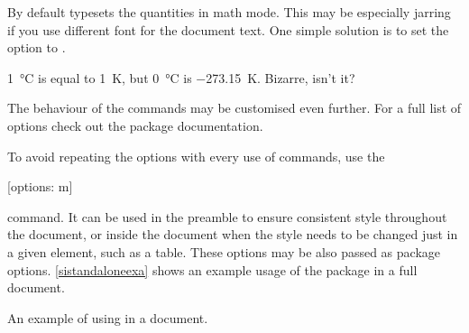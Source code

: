 By default  typesets the quantities in math mode. This may be
especially jarring if you use different font for the document text. One simple
solution is to set the  option to .
\begin{example}
\setmainfont{Source Sans Pro} %
\qty{1}{\degreeCelsius} is
equal to \qty{1}{\kelvin},
but \qty[
  mode = text,
]{0}{\degreeCelsius} is \qty[
  mode = text,
]{-273.15}{\kelvin}.
Bizarre, isn't it?
\end{example}

The behaviour of the commands may be customised even further. For a full list
of options check out the  package documentation.

To avoid repeating the options with every use of commands, use the
\begin{lscommand}
  [options: m]
\end{lscommand}
command. It can be used in the preamble to ensure consistent style throughout
the document, or inside the document when the style needs to be changed just
in a given element, such as a table. These options may be also passed as package
options. \autoref{sistandaloneexa} shows an example usage of the package in
a full document.
\begin{listing}
  \caption{An example of using  in a document.}%
  \label{sistandaloneexa}
\end{listing}

